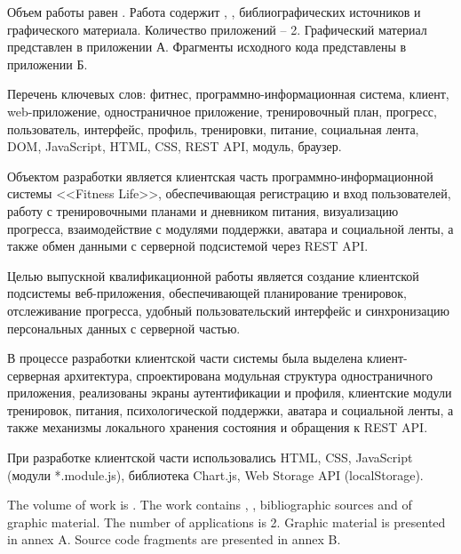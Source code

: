
Объем работы равен . Работа содержит , ,  библиографических источников и  графического материала. Количество приложений – 2. Графический материал представлен в приложении А. Фрагменты исходного кода представлены в приложении Б.

Перечень ключевых слов: фитнес, программно-информационная система, клиент, web-приложение, одностраничное приложение, тренировочный план, прогресс, пользователь, интерфейс, профиль, тренировки, питание, социальная лента, DOM, JavaScript, HTML, CSS, REST API, модуль, браузер.

Объектом разработки является клиентская часть программно-информационной системы <<Fitness Life>>, обеспечивающая регистрацию и вход пользователей, работу с тренировочными планами и дневником питания, визуализацию прогресса, взаимодействие с модулями поддержки, аватара и социальной ленты, а также обмен данными с серверной подсистемой через REST API.

Целью выпускной квалификационной работы является создание клиентской подсистемы веб-приложения, обеспечивающей планирование тренировок, отслеживание прогресса, удобный пользовательский интерфейс и синхронизацию персональных данных с серверной частью.

В процессе разработки клиентской части системы была выделена клиент-серверная архитектура, спроектирована модульная структура одностраничного приложения, реализованы экраны аутентификации и профиля, клиентские модули тренировок, питания, психологической поддержки, аватара и социальной ленты, а также механизмы локального хранения состояния и обращения к REST API.

При разработке клиентской части использовались HTML, CSS, JavaScript (модули *.module.js), библиотека Chart.js, Web Storage API (localStorage).

  
The volume of work is . The work contains , ,  bibliographic sources and  of graphic material. The number of applications is 2. Graphic material is presented in annex A. Source code fragments are presented in annex B.

